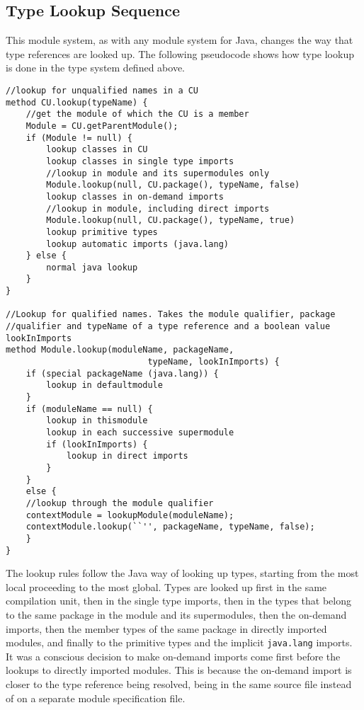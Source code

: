 \subsection{Type Lookup Sequence}

This module system, as with any module system for Java, changes the way that type
references are looked up. The following pseudocode shows how type lookup is done in
the type system defined above. 

\begin{lstlisting}[caption = Type Lookup, tabsize=2, morekeywords={method}]
//lookup for unqualified names in a CU
method CU.lookup(typeName) {
	//get the module of which the CU is a member
	Module = CU.getParentModule();
	if (Module != null) {
		lookup classes in CU
		lookup classes in single type imports
		//lookup in module and its supermodules only
		Module.lookup(null, CU.package(), typeName, false)
		lookup classes in on-demand imports
		//lookup in module, including direct imports
		Module.lookup(null, CU.package(), typeName, true)
		lookup primitive types
		lookup automatic imports (java.lang)
	} else {
		normal java lookup
	}
}

//Lookup for qualified names. Takes the module qualifier, package
//qualifier and typeName of a type reference and a boolean value lookInImports
method Module.lookup(moduleName, packageName, 
							typeName, lookInImports) {
	if (special packageName (java.lang)) {
		lookup in defaultmodule
	}
	if (moduleName == null) {
		lookup in thismodule
		lookup in each successive supermodule
		if (lookInImports) {
			lookup in direct imports
		}
	} 
	else {
	//lookup through the module qualifier
	contextModule = lookupModule(moduleName);
	contextModule.lookup(``'', packageName, typeName, false);
	}
}
\end{lstlisting}

The lookup rules follow the Java way of looking up types,
starting from the most local proceeding to the most global. Types are looked up
first in the same compilation unit, then in the single type imports,
then in the types that belong to the same package in the module and its supermodules, 
then the on-demand imports, then the member types of the same package
in directly imported modules, and finally to the primitive types and the 
implicit {\tt java.lang} imports. It was a conscious decision to make on-demand imports
come first before the lookups to directly imported modules. This is because the on-demand import
is closer to the type reference being resolved, being in the same source file instead of
on a separate module specification file.
